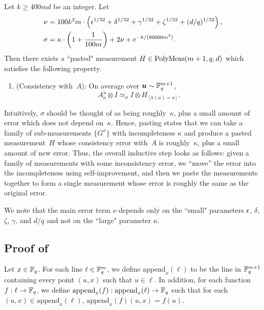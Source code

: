 \begin{theorem}[Pasting]
\begin{enumerate}
  \end{enumerate}
  Let $k \geq 400md$ be an integer. Let
 \begin{align*}
 \nu &= 100 k^2m \cdot \left(\epsilon^{1/32} + \delta^{1/32} + \gamma^{1/32} + \zeta^{1/32} + (d/q)^{1/32}\right),\\
 \sigma& = \kappa \cdot \left(1 + \frac{1}{100m}\right)
    + 2\nu + e^{- k/(80000m^2)}.
 \end{align*}
  Then there exists a ``pasted" measurement $H \in \mathrm{PolyMeas}(m+1, q, d)$ which satisfies the following property.
  \begin{enumerate}
  \item (Consistency with~$A$): \label{item:ld-pasting-inductive-N-consistency} On average over $\boldsymbol{u} \sim \mathbb F_q^{m+1}$,
	  \begin{equation*}
	  A^{u}_a \otimes I \simeq_{\sigma} I \otimes H_{[h(u)=a]}.
	  \end{equation*}
	  
  \end{enumerate}
\end{theorem}

Intuitively, $\sigma$ should be thought of as being roughly~$\kappa$,
plus a small amount of error which does not depend on~$\kappa$.
Hence, pasting states that we can take a family of sub-measurements $\{G^x\}$ with incompleteness $\kappa$
and produce a pasted measurement~$H$ whose consistency error with~$A$ is roughly~$\kappa$,
plus a small amount of new error.
Thus, the overall inductive step looks as follows:
given a family of measurements with some inconsistency error,
we ``move'' the error into the incompleteness using self-improvement,
and then we paste the measurements together to form a single measurement whose error is roughly the same as the original error.

We note that the main error term $\nu$ depends only on the ``small" parameters $\epsilon$, $\delta$, $\zeta$, $\gamma$, and $d/q$ and not on the ``large" parameter $\kappa$.

\subsection{Proof of }\label{sec:proof-of-main-induction}

\begin{definition}
Let $x \in \mathbb F_q$.
For each line $\ell \in \mathbb F_q^m$,
we define $\mathrm{append}_x(\ell)$ to be the line in $\mathbb F_q^{m+1}$ containing every point $(u, x)$ such that $u \in \ell$.
In addition, for each function $f : \ell \rightarrow \mathbb F_q$,
we define $\mathrm{append}_x(f) : \mathrm{append}_x(\ell) \rightarrow \mathbb F_q$
such that for each $(u, x) \in \mathrm{append}_x(\ell)$, $\mathrm{append}_x(f)(u, x) = f(u)$.
\end{definition}

